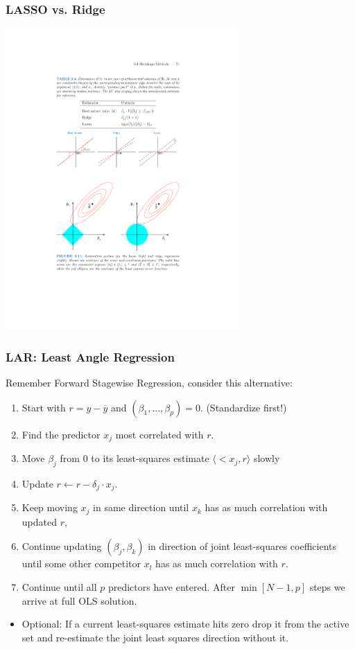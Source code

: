 \documentclass[xcolor=pdftex,dvipsnames,table,mathserif,aspectratio=169]{beamer}
\begin{document}
\begin{frame}
\frametitle{LASSO vs. Ridge}
\begin{center}
\includegraphics[width=3.5in]{./resources/orthcompare}
\end{center}
\end{frame}


\begin{frame}
\frametitle{LAR: Least Angle Regression}
Remember Forward Stagewise Regression, consider this alternative:
\begin{enumerate}
\item Start with $r= y-\overline{y}$ and $(\beta_1, \ldots, \beta_p) = 0$. (Standardize first!)
\item Find the predictor $x_j$ most correlated with $r$.
\item Move $\beta_j$ from 0 to its least-squares estimate $\langle<x_j , r \rangle$ slowly
\item Update $r \leftarrow r - \delta_j \cdot x_j$.
\item Keep moving $x_j$ in same direction until $x_k$ has as much correlation with updated $r$,
\item Continue updating $(\beta_j, \beta_k)$ in direction of \alert{joint} least-squares coefficients until some other competitor $x_l$ has as much correlation with $r$.
\item Continue until all $p$ predictors have entered. After $\min[N-1,p]$ steps we arrive at full OLS solution.
\end{enumerate}
\begin{itemize}
\item \alert{Optional:} If a current least-squares estimate hits zero drop it from the active set and re-estimate the joint least squares direction without it.
\end{itemize}
\end{frame}
\end{document}
